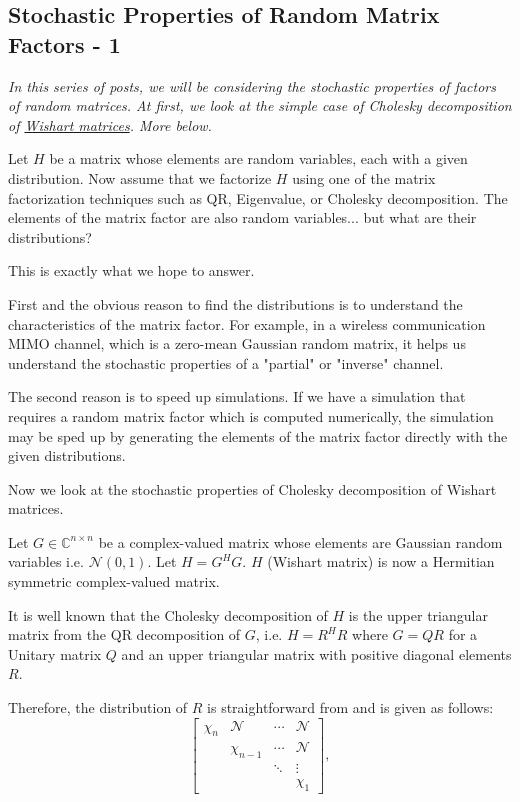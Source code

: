 \subsection{Stochastic Properties of Random Matrix Factors - 1}

\emph{In this series of posts, we will be considering the stochastic properties of factors of random matrices. At first, we look at the simple case of Cholesky decomposition of \href{https://en.wikipedia.org/wiki/Wishart_distribution}{Wishart matrices}. More below.}

Let $H$ be a matrix whose elements are random variables, each with a given distribution. Now assume that we factorize $H$ using one of the matrix factorization techniques such as QR, Eigenvalue, or Cholesky decomposition. The elements of the matrix factor are also random variables... but what are their distributions?

This is exactly what we hope to answer.

First and the obvious reason to find the distributions is to understand the characteristics of the matrix factor. For example, in a wireless communication MIMO channel, which is a zero-mean Gaussian random matrix, it helps us understand the stochastic properties of a "partial" or "inverse" channel.

The second reason is to speed up simulations. If we have a simulation that requires a random matrix factor which is computed numerically, the simulation may be sped up by generating the elements of the matrix factor directly with the given distributions.

Now we look at the stochastic properties of Cholesky decomposition of Wishart matrices.

Let $G \in \mathbb{C}^{n \times n}$ be a complex-valued matrix whose elements are Gaussian random variables i.e. $\mathcal{N}(0,1)$. Let $H = G^H G$. $H$ (Wishart matrix) is now a Hermitian symmetric complex-valued matrix.

It is well known that the Cholesky decomposition of $H$ is the upper triangular matrix from the QR decomposition of $G$, i.e. $H = R^H R$ where $G = QR$ for a Unitary matrix $Q$ and an upper triangular matrix with positive diagonal elements $R$.

Therefore, the distribution of $R$ is straightforward from \cite{Edelman2005} and is given as follows:
$$
\begin{bmatrix}
	\chi_n & \mathcal{N} & \cdots & \mathcal{N} \\
	& \chi_{n-1} & \cdots & \mathcal{N} \\
	&                   & \ddots & \vdots \\
	&                   &            & \chi_1
\end{bmatrix},
$$

